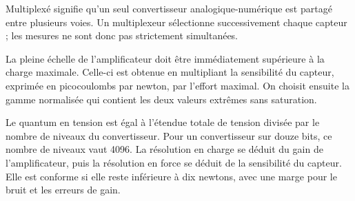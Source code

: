 \begin{corrigebox}
Multiplexé signifie qu'un seul convertisseur analogique-numérique est partagé entre plusieurs voies. Un multiplexeur sélectionne successivement chaque capteur ; les mesures ne sont donc pas strictement simultanées.

La pleine échelle de l'amplificateur doit être immédiatement supérieure à la charge maximale. Celle-ci est obtenue en multipliant la sensibilité du capteur, exprimée en picocoulombs par newton, par l'effort maximal. On choisit ensuite la gamme normalisée qui contient les deux valeurs extrêmes sans saturation.

Le quantum en tension est égal à l'étendue totale de tension divisée par le nombre de niveaux du convertisseur. Pour un convertisseur sur douze bits, ce nombre de niveaux vaut 4096. La résolution en charge se déduit du gain de l'amplificateur, puis la résolution en force se déduit de la sensibilité du capteur. Elle est conforme si elle reste inférieure à dix newtons, avec une marge pour le bruit et les erreurs de gain.
\end{corrigebox}
